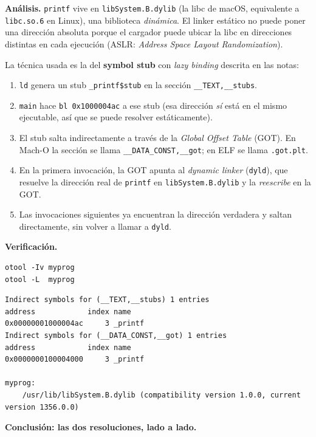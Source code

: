 \documentclass[11pt,a4paper]{article}
\begin{document}
\textbf{Análisis.} \texttt{printf} vive en \texttt{libSystem.B.dylib}
(la libc de macOS, equivalente a \texttt{libc.so.6} en Linux), una
biblioteca \emph{dinámica}. El linker estático no puede poner una
dirección absoluta porque el cargador puede ubicar la libc en
direcciones distintas en cada ejecución (ASLR: \emph{Address Space
Layout Randomization}).

La técnica usada es la del \textbf{symbol stub} con \emph{lazy
binding} descrita en las notas:

\begin{enumerate}[leftmargin=*]
    \item \texttt{ld} genera un stub \texttt{\_printf\$stub} en la
        sección \texttt{\_\_TEXT,\_\_stubs}.
    \item \texttt{main} hace \texttt{bl 0x1000004ac} a ese stub
        (esa dirección \emph{sí} está en el mismo ejecutable, así que
        se puede resolver estáticamente).
    \item El stub salta indirectamente a través de la
        \emph{Global Offset Table} (GOT). En Mach-O la sección se llama
        \texttt{\_\_DATA\_CONST,\_\_got}; en ELF se llama
        \texttt{.got.plt}.
    \item En la primera invocación, la GOT apunta al \emph{dynamic
        linker} (\texttt{dyld}), que resuelve la dirección real de
        \texttt{printf} en \texttt{libSystem.B.dylib} y la
        \emph{reescribe} en la GOT.
    \item Las invocaciones siguientes ya encuentran la dirección
        verdadera y saltan directamente, sin volver a llamar a
        \texttt{dyld}.
\end{enumerate}

\textbf{Verificación.}

\begin{lstlisting}
otool -Iv myprog
otool -L  myprog
\end{lstlisting}

\begin{lstlisting}[style=outstyle]
Indirect symbols for (__TEXT,__stubs) 1 entries
address            index name
0x00000001000004ac     3 _printf
Indirect symbols for (__DATA_CONST,__got) 1 entries
address            index name
0x0000000100004000     3 _printf

myprog:
    /usr/lib/libSystem.B.dylib (compatibility version 1.0.0, current version 1356.0.0)
\end{lstlisting}

\textbf{Conclusión: las dos resoluciones, lado a lado.}
\end{document}
